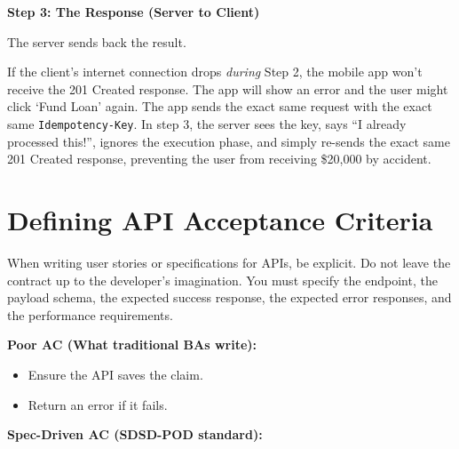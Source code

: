 \textbf{Step 3: The Response (Server to Client)}

The server sends back the result.

\begin{Shaded}
\begin{Highlighting}[]

\NormalTok{\{}
\NormalTok{\}}
\end{Highlighting}
\end{Shaded}

If the client's internet connection drops \emph{during} Step 2, the
mobile app won't receive the 201 Created response. The app will show an
error and the user might click `Fund Loan' again. The app sends the
exact same request with the exact same \texttt{Idempotency-Key}. In step
3, the server sees the key, says ``I already processed this!'', ignores
the execution phase, and simply re-sends the exact same 201 Created
response, preventing the user from receiving \$20,000 by accident.

\section{Defining API Acceptance
Criteria}\label{defining-api-acceptance-criteria}

When writing user stories or specifications for APIs, be explicit. Do
not leave the contract up to the developer's imagination. You must
specify the endpoint, the payload schema, the expected success response,
the expected error responses, and the performance requirements.

\textbf{Poor AC (What traditional BAs write):}

\begin{itemize}
\tightlist
\item
  Ensure the API saves the claim.
\item
  Return an error if it fails.
\end{itemize}

\textbf{Spec-Driven AC (SDSD-POD standard):}

